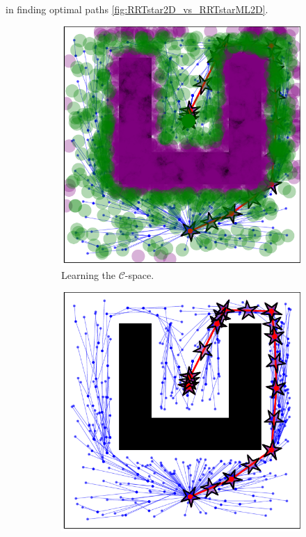 \documentclass{ctuthesis}
\begin{document}
in finding optimal paths \ref{fig:RRTstar2D_vs_RRTstarML2D}. 
\begin{figure}[!ht]
  \centering 
  \begin{subfigure}[b]{0.45\textwidth}
      \includegraphics[width=\textwidth]{figChap4/RRTstar2DML_learning237.2.pdf}
      \caption{Learning the $\mathcal{C}$-space.}
      \label{fig:rrtstarML2D_learning}
  \end{subfigure}  
  \begin{subfigure}[b]{0.45\textwidth}
      \includegraphics[width=\textwidth]{figChap4/RRTstar2DML_maze237.2.pdf}

\end{subfigure}
\end{figure}
\end{document}

